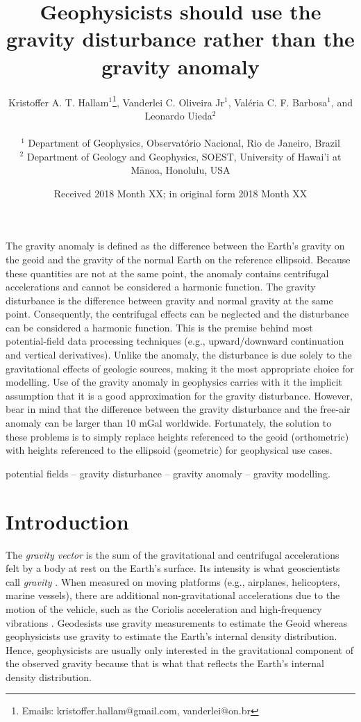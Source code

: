 \documentclass[extra]{gji}
\title[Gravity anomaly or gravity disturbance?]
      {Geophysicists should use the gravity disturbance rather than the gravity anomaly}
\author[Hallam et al.]{
\parbox{\linewidth}{%
    Kristoffer A. T. Hallam$^{1}$\thanks{Emails: kristoffer.hallam@gmail.com, vanderlei@on.br},
    Vanderlei C. Oliveira Jr$^1$,
    Val\'{e}ria C. F. Barbosa$^1$, and \linebreak Leonardo Uieda$^2$
    \vspace{0.3cm}
}%
    \\
    $^1$ Department of Geophysics, Observat\'{o}rio Nacional, Rio de Janeiro, Brazil \\
    $^2$ Department of Geology and Geophysics, SOEST, University of Hawai'i at M\={a}noa, Honolulu, USA
}
\date{Received 2018 Month XX; in original form 2018 Month XX}
\begin{document}
\label{firstpage}

\maketitle


\begin{summary}
 The gravity anomaly is defined as the difference between the Earth's gravity
 on the geoid and the gravity of the normal Earth on the reference ellipsoid.
 Because these quantities are not at the same point, the anomaly contains
 centrifugal accelerations and cannot be considered a harmonic function.
 The gravity disturbance is the difference between gravity and normal gravity
 at the same point.
 Consequently, the centrifugal effects can be neglected and the disturbance can
 be considered a harmonic function.
 This is the premise behind most potential-field data processing techniques
 (e.g., upward/downward continuation and vertical derivatives).
 Unlike the anomaly, the disturbance is due solely to the
 gravitational effects of geologic sources, making it the most appropriate
 choice for modelling.
 Use of the gravity anomaly in geophysics carries with it the implicit
 assumption that it is a good approximation for the gravity disturbance.
 However, bear in mind that the difference between the gravity disturbance and
 the free-air anomaly can be larger than 10 mGal worldwide.
 Fortunately, the solution to these problems is to simply replace
 heights referenced to the geoid (orthometric) with heights referenced to the
 ellipsoid (geometric) for geophysical use cases.
\end{summary}

\begin{keywords}
 potential fields -- gravity disturbance -- gravity anomaly -- gravity modelling.
\end{keywords}


\section{Introduction}

The \textit{gravity vector} is the sum of the gravitational and centrifugal
accelerations felt by a body at rest on the Earth's surface.
Its intensity is what geoscientists call \textit{gravity}
\citep{heiskanen-moritz1967, hofmann-wellenhof-moritz2005}.
When measured on moving platforms (e.g., airplanes,
helicopters, marine vessels), there are additional
non-gravitational accelerations due to the motion of the vehicle,
such as the Coriolis acceleration and high-frequency vibrations
\citep{glennie-etal2000,nabighian-etal2005-grav,baumann-etal2012}.
Geodesists use gravity measurements to estimate the Geoid \citep{li2001}
whereas geophysicists use gravity to estimate the Earth's
internal density distribution.
Hence, geophysicists are usually only interested
in the gravitational component of the observed gravity
because that is what that reflects the Earth's internal density distribution.
\end{document}
